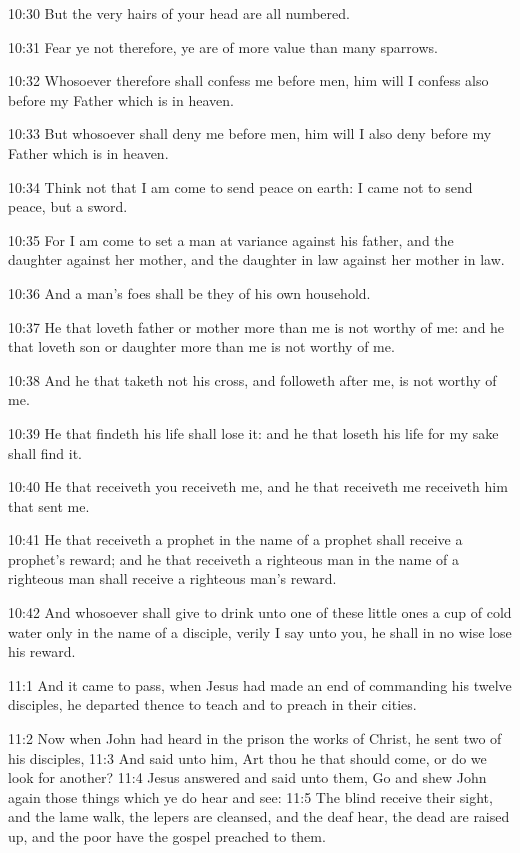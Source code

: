 10:30 But the very hairs of your head are all numbered.

10:31 Fear ye not therefore, ye are of more value than many sparrows.

10:32 Whosoever therefore shall confess me before men, him will I confess also before my Father which is in heaven.

10:33 But whosoever shall deny me before men, him will I also deny before my Father which is in heaven.

10:34 Think not that I am come to send peace on earth: I came not to send peace, but a sword.

10:35 For I am come to set a man at variance against his father, and the daughter against her mother, and the daughter in law against her mother in law.

10:36 And a man's foes shall be they of his own household.

10:37 He that loveth father or mother more than me is not worthy of me: and he that loveth son or daughter more than me is not worthy of me.

10:38 And he that taketh not his cross, and followeth after me, is not worthy of me.

10:39 He that findeth his life shall lose it: and he that loseth his life for my sake shall find it.

10:40 He that receiveth you receiveth me, and he that receiveth me receiveth him that sent me.

10:41 He that receiveth a prophet in the name of a prophet shall receive a prophet's reward; and he that receiveth a righteous man in the name of a righteous man shall receive a righteous man's reward.

10:42 And whosoever shall give to drink unto one of these little ones a cup of cold water only in the name of a disciple, verily I say unto you, he shall in no wise lose his reward.

11:1 And it came to pass, when Jesus had made an end of commanding his twelve disciples, he departed thence to teach and to preach in their cities.

11:2 Now when John had heard in the prison the works of Christ, he sent two of his disciples, 11:3 And said unto him, Art thou he that should come, or do we look for another?  11:4 Jesus answered and said unto them, Go and shew John again those things which ye do hear and see: 11:5 The blind receive their sight, and the lame walk, the lepers are cleansed, and the deaf hear, the dead are raised up, and the poor have the gospel preached to them.


